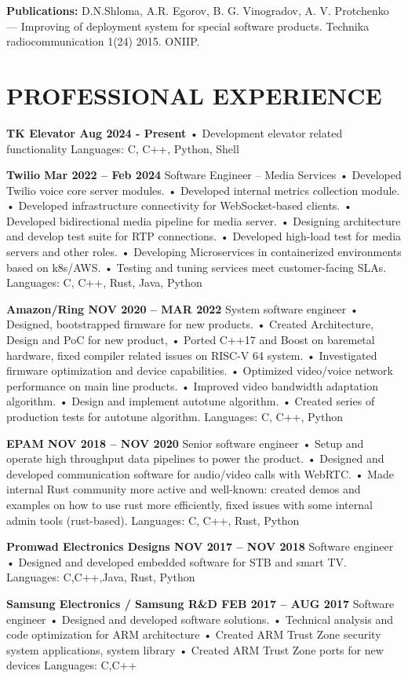 \documentclass{article}
\begin{document}
\textbf{Publications:}
D.N.Shloma, A.R. Egorov, B. G. Vinogradov, A. V. Protchenko — Improving of deployment
system for special software products. Technika radiocommunication 1(24) 2015. ONIIP.

\section{\textsf{PROFESSIONAL EXPERIENCE}}
\textbf{TK Elevator Aug 2024 - Present}
• Development elevator related functionality
Languages: C, C++, Python, Shell

\textbf{Twilio Mar 2022 – Feb 2024}
Software Engineer – Media Services
• Developed Twilio voice core server modules.
• Developed internal metrics collection module.
• Developed infrastructure connectivity for WebSocket-based clients.
• Developed bidirectional media pipeline for media server.
• Designing architecture and develop test suite for RTP connections.
• Developed high-load test for media servers and other roles.
• Developing Microservices in containerized environments based on k8s/AWS.
• Testing and tuning services meet customer-facing SLAs.
Languages: C, C++, Rust, Java, Python

\textbf{Amazon/Ring NOV 2020 – MAR 2022}
System software engineer
• Designed, bootstrapped firmware for new products.
• Created Architecture, Design and PoC for new product,
• Ported C++17 and Boost on baremetal hardware, fixed compiler related issues on RISC-V 64 system.
• Investigated firmware optimization and device capabilities.
• Optimized video/voice network performance on main line products.
• Improved video bandwidth adaptation algorithm.
• Design and implement autotune algorithm.
• Created series of production tests for autotune algorithm.
Languages: C, C++, Python

\textbf{EPAM NOV 2018 – NOV 2020}
Senior software engineer
• Setup and operate high throughput data pipelines to power the product.
• Designed and developed communication software for audio/video calls with WebRTC.
• Made internal Rust community more active and well-known: created demos and examples on how to use rust
more efficiently, fixed issues with some internal admin tools (rust-based).
Languages: C, C++, Rust, Python

\textbf{Promwad Electronics Designs NOV 2017 – NOV 2018}
Software engineer
• Designed and developed embedded software for STB and smart TV.
Languages: C,C++,Java, Rust, Python

\textbf{Samsung Electronics / Samsung R\&D FEB 2017 – AUG 2017}
Software engineer
• Designed and developed software solutions.
• Technical analysis and code optimization for ARM architecture
• Created ARM Trust Zone security system applications, system library
• Created ARM Trust Zone ports for new devices
Languages: C,C++
\end{document}
